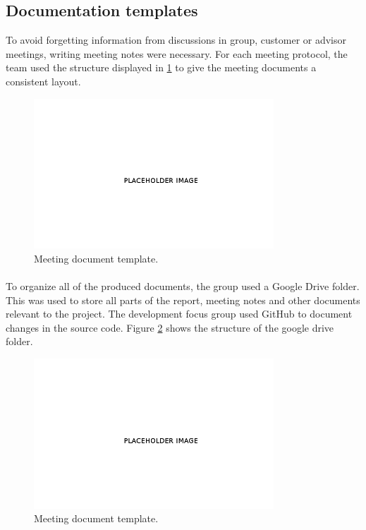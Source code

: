 \subsection{Documentation templates}
\label{subsec:PlanningQualityDocu}
To avoid forgetting information from discussions in group, customer or advisor meetings, writing meeting notes were necessary. For each meeting protocol, the team used the structure displayed in \ref{fig:PlanningQualityDocuMeeting} to give the meeting documents a consistent layout.

\begin{figure}[ht!]
\centering
\includegraphics[width=90mm]{./img/Placehoder}
\caption{Meeting document template. \label{fig:PlanningQualityDocuMeeting}}
\end{figure}

\paragraph{} To organize all of the produced documents, the group used a Google Drive folder. This was used to store all parts of the report, meeting notes and other documents relevant to the project. The development focus group used GitHub to document changes in the source code. Figure \ref{fig:PlanningQualityDocuDrive} shows the structure of the google drive folder.

\begin{figure}[ht!]
\centering
\includegraphics[width=90mm]{./img/Placehoder}
\caption{Meeting document template. \label{fig:PlanningQualityDocuDrive}}
\end{figure}


